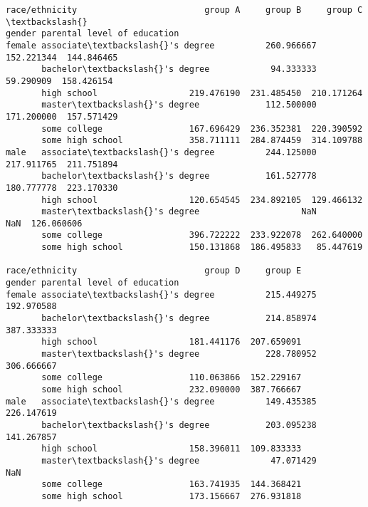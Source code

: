             \begin{tcolorbox}[breakable, size=fbox, boxrule=.5pt, pad at break*=1mm, opacityfill=0]
\begin{Verbatim}[commandchars=\\\{\}]
race/ethnicity                         group A     group B     group C  \textbackslash{}
gender parental level of education
female associate\textbackslash{}'s degree          260.966667  152.221344  144.846465
       bachelor\textbackslash{}'s degree            94.333333   59.290909  158.426154
       high school                  219.476190  231.485450  210.171264
       master\textbackslash{}'s degree             112.500000  171.200000  157.571429
       some college                 167.696429  236.352381  220.390592
       some high school             358.711111  284.874459  314.109788
male   associate\textbackslash{}'s degree          244.125000  217.911765  211.751894
       bachelor\textbackslash{}'s degree           161.527778  180.777778  223.170330
       high school                  120.654545  234.892105  129.466132
       master\textbackslash{}'s degree                    NaN         NaN  126.060606
       some college                 396.722222  233.922078  262.640000
       some high school             150.131868  186.495833   85.447619

race/ethnicity                         group D     group E
gender parental level of education
female associate\textbackslash{}'s degree          215.449275  192.970588
       bachelor\textbackslash{}'s degree           214.858974  387.333333
       high school                  181.441176  207.659091
       master\textbackslash{}'s degree             228.780952  306.666667
       some college                 110.063866  152.229167
       some high school             232.090000  387.766667
male   associate\textbackslash{}'s degree          149.435385  226.147619
       bachelor\textbackslash{}'s degree           203.095238  141.267857
       high school                  158.396011  109.833333
       master\textbackslash{}'s degree              47.071429         NaN
       some college                 163.741935  144.368421
       some high school             173.156667  276.931818
\end{Verbatim}
\end{tcolorbox}
